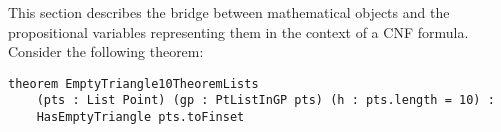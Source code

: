 This section describes the bridge between mathematical objects and the propositional variables representing them in the context of a CNF formula. 
Consider the following theorem: 

\begin{lstlisting}
theorem EmptyTriangle10TheoremLists 
    (pts : List Point) (gp : PtListInGP pts) (h : pts.length = 10) :
    HasEmptyTriangle pts.toFinset
\end{lstlisting}









